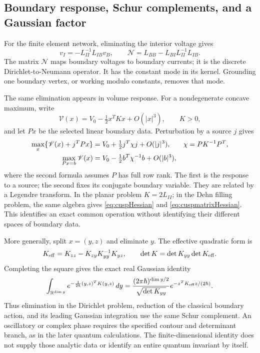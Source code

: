 \subsection{Boundary response, Schur complements, and a Gaussian factor}

For the finite element network, eliminating the interior voltage gives
\begin{equation}
 v_I=-L_{II}^{-1}L_{IB}v_B,\qquad
 \mathcal N=L_{BB}-L_{BI}L_{II}^{-1}L_{IB}.
 \label{eq:ipolyDtN}
\end{equation}
The matrix $\mathcal N$ maps boundary voltages to boundary currents;
it is the discrete Dirichlet-to-Neumann operator. It has the constant
mode in its kernel. Grounding one boundary vertex, or working modulo
constants, removes that mode.

The same elimination appears in volume response. For a nondegenerate
concave maximum, write
\[
 \mathscr V(x)=V_0-\tfrac12x^TKx+O(|x|^3),\qquad K>0,
\]
and let $Px$ be the selected linear boundary data. Perturbation by a
source $j$ gives
\begin{align}
 \max_x\{\mathscr V(x)+j^TPx\}
    &=V_0+\tfrac12j^T\chi j+O(|j|^3),
 &\chi&=PK^{-1}P^T,\notag\\
 \max_{Px=b}\mathscr V(x)
    &=V_0-\tfrac12b^T\chi^{-1}b+O(|b|^3),
 \label{eq:ipolyBoundaryResponse}
\end{align}
where the second formula assumes $P$ has full row rank. The first is
the response to a source; the second fixes its conjugate boundary
variable. They are related by a Legendre transform. In the planar
problem $K=2L_{II}$; in the Dehn filling problem, the same algebra gives
\eqref{eq:cuspHessian} and \eqref{eq:cuspmatrixHessian}. This identifies
an exact common operation without identifying their different spaces
of boundary data.

More generally, split $x=(y,z)$ and eliminate $y$. The effective
quadratic form is
\begin{equation}
 K_{\rm eff}=K_{zz}-K_{zy}K_{yy}^{-1}K_{yz},\qquad
 \det K=\det K_{yy}\det K_{\rm eff}.
 \label{eq:ipolySchur}
\end{equation}
Completing the square gives the exact real Gaussian identity
\begin{equation}
 \int_{\mathbb R^{\dim y}}
 e^{-\frac1{2\hbar}(y,z)^TK(y,z)}\,dy
 =\frac{(2\pi\hbar)^{\dim y/2}}{\sqrt{\det K_{yy}}}
       e^{-z^TK_{\rm eff}z/(2\hbar)}.
 \label{eq:ipolyGaussian}
\end{equation}
Thus elimination in the Dirichlet problem, reduction of the classical
boundary action, and its leading Gaussian integration use the same
Schur complement. An oscillatory or complex phase requires the specified
contour and determinant branch, as in the later quantum calculations.
The finite-dimensional identity does not supply those analytic data
or identify an entire quantum invariant by itself.

